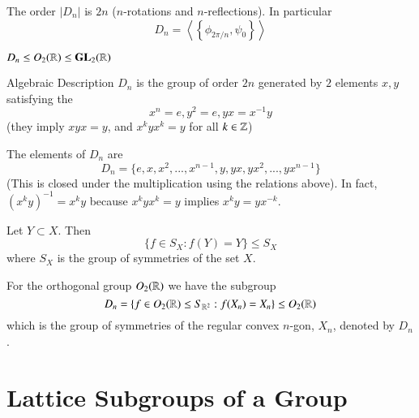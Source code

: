\documentclass[12pt, a4paper, twoside, openright, titlepage]{book}
\begin{document}
\begin{cor}{}{}
    The order $|D_n|$ is $2n$ ($n$-rotations and $n$-reflections). In particular \begin{equation}
        D_n = \left\langle \left\{\phi_{2\pi/n},\psi_0\right\}\right\rangle
    \end{equation}
\end{cor}

\begin{rmk}{}{}
    $D_n \leq O_2(\mathbb R) \leq \mathbf{GL}_2(\mathbb R)$
\end{rmk}

\begin{defn}{Algebraic Description}{}
    $D_n$ is the group of order $2n$ generated by $2$ elements $x,y$ satisfying the  \begin{equation}
        x^n = e, y^2 = e, yx = x^{-1}y
    \end{equation}
    (they imply $xyx = y$, and $x^kyx^k = y$ for all $k \in \mathbb Z$)
\end{defn}

\begin{rmk}{}{}
    The elements of $D_n$ are \begin{equation}
        D_n = \{e,x,x^2,...,x^{n-1},y,yx,yx^2,...,yx^{n-1}\}
    \end{equation}
    (This is closed under the multiplication using the relations above). In fact, $(x^ky)^{-1} = x^ky$ because $x^kyx^k = y$ implies $x^ky = yx^{-k}$.
\end{rmk}

\begin{rmk}{}{}
    Let $Y \subset X$. Then \begin{equation}
        \{f\in S_X:f(Y) = Y\} \leq S_X
    \end{equation}
    where $S_X$ is the group of symmetries of the set $X$.
\end{rmk}


\begin{rmk}{}{}
    For the orthogonal group $O_2(\mathbb R)$ we have the subgroup \begin{equation}
        D_n = \{f\in O_2(\mathbb R) \leq S_{\mathbb R^2}:f(X_n) = X_n\} \leq O_2(\mathbb R)
    \end{equation}
    which is the group of symmetries of the regular convex $n$-gon, $X_n$, denoted by $D_n$.
\end{rmk}

\section{\textsection Lattice Subgroups of a Group}
\end{document}
